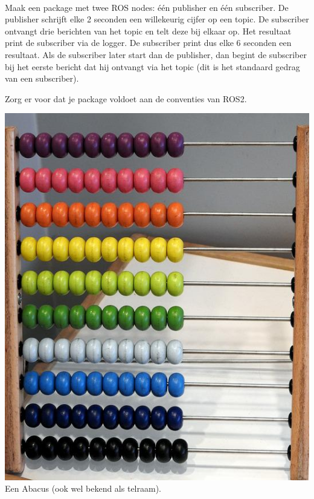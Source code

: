 \newpage %

\begin{exercise}[Abacus]\mbox{}\\
\begin{minipage}{0.6\textwidth}
Maak een package met twee ROS nodes: één publisher en één subscriber. De publisher schrijft elke 2 seconden een willekeurig cijfer op een topic. De subscriber ontvangt drie berichten van het topic en telt deze bij elkaar op. Het resultaat print de subscriber via de logger. De subscriber print dus elke 6 seconden een resultaat. Als de subscriber later start dan de publisher, dan begint de subscriber bij het eerste bericht dat hij ontvangt via het topic (dit is het standaard gedrag van een subscriber).

Zorg er voor dat je package voldoet aan de conventies van ROS2.
\end{minipage}\hfill 
\begin{minipage}{0.3\textwidth}
\begin{center}
\includegraphics[width=\textwidth]{Pictures/cc_pixabay_abacus.jpg}\\
Een Abacus (ook wel bekend als telraam).\\
\end{center}
\end{minipage}
\end{exercise}

